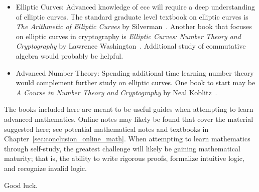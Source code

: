 \begin{itemize}
\item Elliptic Curves:
    Advanced knowledge of \gls{ecc} will
    require a deep understanding of \glspl{elliptic curve}.
    The standard graduate level textbook on \glspl{elliptic curve} is
    \emph{The Arithmetic of Elliptic Curves} by Silverman~\cite{AEC}.
    Another book that focuses on elliptic curves in cryptography
    is \emph{Elliptic Curves: Number Theory and Cryptography}
    by Lawrence Washington~\cite{WashingtonEllipticCurves}.
    Additional study of commutative algebra would probably be helpful.
\item Advanced Number Theory:
    Spending additional time learning \gls{number theory} would complement
    further study on \glspl{elliptic curve}.
    One book to start may be
    \emph{A Course in Number Theory and Cryptography}
    by Neal Koblitz~\cite{KoblitzCourseNTCrypto}.
\end{itemize}

\noindent
The books included here are meant to be useful guides when attempting
to learn advanced mathematics.
Online notes may likely be found that cover the material suggested here;
see potential mathematical notes and textbooks in
Chapter~\ref{sec:conclusion_online_math}.
When attempting to learn mathematics through self-study,
the greatest challenge will likely be gaining mathematical maturity;
that is, the ability to write rigorous proofs, formalize intuitive logic,
and recognize invalid logic.

Good luck.

